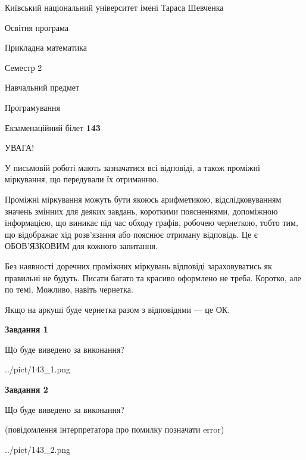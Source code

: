 \documentclass[12pt, ukrainian]{article}
\begin{document}
{{\begin {small}\par
{ \center  Київський національний університет імені Тараса Шевченка \par}
{\parbox {5 cm}{Освітня програма \hfill}{\parbox {7 cm}{Прикладна математика\hfill}}\parbox {6 cm}{\hfill Семестр 2}}\par
{\parbox {5 cm} {Навчальний предмет \hfill}\parbox {7 cm}{Програмування \hfill}\parbox {6cm}{\hfill}\par}\vspace{-7pt} \end{small}}{\center Екзаменаційний білет \No \textbf
{ 143 }\par}}
{
\begin {large}
УВАГА!

У письмовій роботі мають зазначатися всі відповіді, а також проміжні міркування, що передували їх отриманню.

Проміжні міркування можуть бути якоюсь арифметикою, відслідковуванням зна\-чень змінних для деяких завдань,
короткими поясненнями, допоміжною інформацією, що виникає під час обходу графів, робочею чернеткою,
тобто тим, що відображає хід розв’язання або пояснює отриману відповідь.
Це є ОБОВ’ЯЗКОВИМ для кожного запитання.

Без наявності доречних проміжних міркувань відповіді зараховуватись як правиль\-ні не будуть.
Писати багато та красиво оформлено не треба. Коротко, але по темі. Можли\-во, навіть чернетка.

Якщо на аркуші буде чернетка разом з відповідями --- це ОК.

\newpage

{\begin {center}\textbf{Завдання 1}\end {center}}\par
Що буде виведено за виконання?\par
\begin{center}
	{../pict/143_1.png}
\end{center}
\newpage

{\begin {center}\textbf{Завдання 2}\end {center}}\par
Що буде виведено за виконання?\par
 (повідомлення інтерпретатора про помилку позначати error)\par
\begin{center}
	{../pict/143_2.png}
\end{center}
\newpage


\end{large}}
\end{document}
